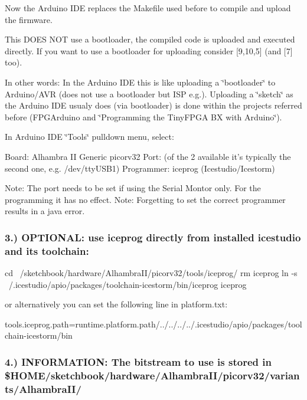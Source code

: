 Now the Arduino I\-D\-E replaces the Makefile used before to compile and upload the firmware.

This D\-O\-E\-S N\-O\-T use a bootloader, the compiled code is uploaded and executed directly. If you want to use a bootloader for uploading consider \mbox{[}9,10,5\mbox{]} (and \mbox{[}7\mbox{]} too).

In other words\-: In the Arduino I\-D\-E this is like uploading a \char`\"{}bootloader\char`\"{} to Arduino/\-A\-V\-R (does not use a bootloader but I\-S\-P e.\-g.). Uploading a \char`\"{}sketch\char`\"{} as the Arduino I\-D\-E usualy does (via bootloader) is done within the projects referred before (F\-P\-G\-Arduino and \char`\"{}\-Programming the Tiny\-F\-P\-G\-A B\-X with Arduino\char`\"{}).

In Arduino I\-D\-E \char`\"{}\-Tools\char`\"{} pulldown menu, select\-: \begin{DoxyVerb}Board: Alhambra II Generic picorv32
Port: (of the 2 available it's typically the second one, e.g. /dev/ttyUSB1)
Programmer: iceprog (Icestudio/Icestorm)
\end{DoxyVerb}


Note\-: The port needs to be set if using the Serial Montor only. For the programming it has no effect. Note\-: Forgetting to set the correct programmer results in a java error.

\subsubsection*{3.) O\-P\-T\-I\-O\-N\-A\-L\-: use iceprog directly from installed icestudio and its toolchain\-:}

\begin{DoxyVerb}cd ~/sketchbook/hardware/AlhambraII/picorv32/tools/iceprog/
rm iceprog
ln -s ~/.icestudio/apio/packages/toolchain-icestorm/bin/iceprog iceprog
\end{DoxyVerb}


or alternatively you can set the following line in platform.\-txt\-: \begin{DoxyVerb}tools.iceprog.path={runtime.platform.path}/../../../../.icestudio/apio/packages/toolchain-icestorm/bin
\end{DoxyVerb}


\subsubsection*{4.) I\-N\-F\-O\-R\-M\-A\-T\-I\-O\-N\-: The bitstream to use is stored in \$\-H\-O\-M\-E/sketchbook/hardware/\-Alhambra\-I\-I/picorv32/variants/\-Alhambra\-I\-I/}

